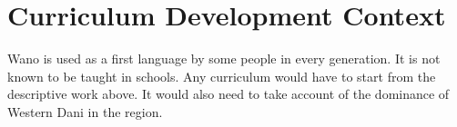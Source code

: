 \documentclass[12pt]{article}
\begin{document}
\section{Curriculum Development Context}
Wano is used as a first language by some people in every generation. It is not known to be taught in schools. Any curriculum would have to start from the descriptive work above. It would also need to take account of the dominance of Western Dani in the region.
\end{document}

